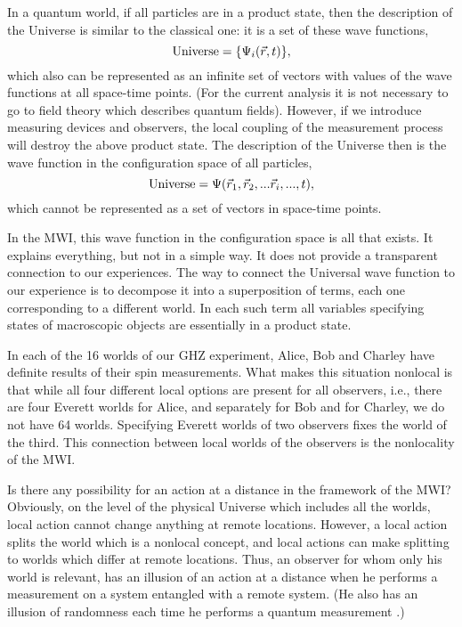 \documentclass[11pt]{article}
\begin{document}
In a quantum world, if all particles are in a product state, then the description of the Universe is similar to the classical one: it is a set of these wave functions,
\begin{equation}\label{prodUni}
{\rm Universe}  = \{\Psi_i(\vec{r},t)\},
\end{equation}
which also can be represented as an infinite set of vectors with values of the wave functions at all space-time points. (For the current analysis it is not necessary to go to field theory which describes quantum fields). However, if we introduce measuring devices and observers, the local coupling of the measurement process will destroy the above product state. The description of the Universe then is the wave function in the configuration space of all particles,
\begin{equation}\label{Uni}
{\rm Universe}  =  \Psi(\vec{r}_1, \vec{r}_2,...\vec{r}_i,...,t) ,
\end{equation}
 which cannot be represented   as a set of vectors in  space-time points.


 In the MWI, this wave function in the configuration space is all that exists. It  explains everything, but not in a simple way. It does not provide a transparent connection to  our experiences. The way to connect the Universal wave function to our experience is to decompose it into a superposition of terms, each one corresponding to a different world. In each such term all    variables specifying states of macroscopic objects are essentially in a product state. 
 
 In each of the 16 worlds of our  GHZ experiment,  Alice, Bob and Charley have definite results of their spin measurements. What makes this situation nonlocal is that while all four different local options are present for all observers, i.e., there are four Everett worlds for Alice, and separately for  Bob and for Charley, we do not have 64 worlds. Specifying Everett worlds of two observers fixes the world of the third. This connection between local worlds of the observers is the nonlocality of the MWI.

 Is there any possibility for an action at a distance in the framework of the MWI? Obviously, on the level of the physical Universe which includes all the worlds, local action cannot change anything at remote locations. However, a local action splits the world which is a nonlocal concept, and local actions can make splitting to worlds which differ at remote locations. Thus, an observer for whom only his world is relevant,  has an illusion of an action at a distance when he performs a measurement on a system entangled with a remote system. (He also has an illusion of randomness each time he performs a quantum measurement \cite{qmdet}.)
\end{document}

